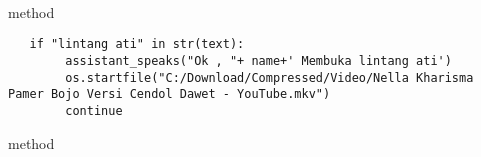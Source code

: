\\
\\
\\
\\
\\
\\
\\
\\
\\
\\
\\
\\
\\
\\
\\
\\
\\
\\
\\
\\
\\
\\
\\
\\
\\
 method 
\begin{lstlisting}
   if "lintang ati" in str(text):
        assistant_speaks("Ok , "+ name+' Membuka lintang ati')
        os.startfile("C:/Download/Compressed/Video/Nella Kharisma Pamer Bojo Versi Cendol Dawet - YouTube.mkv")
        continue
\end{lstlisting}
 method 
\\
\\
\\
\\
\\
\\
\\
\\
\\
\\
\\
\\
\\
\\
\\
\\
\\
\\
\\
\\
\\
\\
\\
\\
\\
\\
\\
\\
